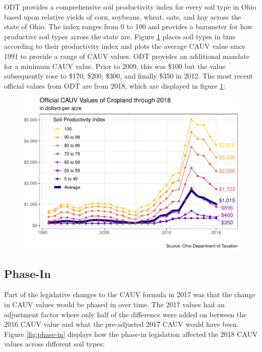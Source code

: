 \documentclass[]{article}
\begin{document}
ODT provides a comprehensive soil productivity index for every soil type
in Ohio based upon relative yields of corn, soybeans, wheat, oats, and
hay across the state of Ohio. The index ranges from 0 to 100 and
provides a barometer for how productive soil types across the state are.
Figure \ref{fig:cropland-trend} places soil types in bins according to
their productivity index and plots the average CAUV value since 1991 to
provide a range of CAUV values. ODT provides an additional mandate for a
minimum CAUV value. Prior to 2009, this was \$100 but the value
subsequently rose to \$170, \$200, \$300, and finally \$350 in 2012. The
most recent official values from ODT are from 2018, which are displayed
in figure \ref{fig:cropland-trend}:

\begin{figure}[H]
\includegraphics[width=1\linewidth]{4-projections-2019-2020_files/figure-latex/cropland-trend-1} \caption{\label{fig:cropland-trend}}\label{fig:cropland-trend}
\end{figure}

\hypertarget{phase-in}{%
\subsection{Phase-In}\label{phase-in}}

Part of the legislative changes to the CAUV formula in 2017 was that the
change in CAUV values would be phased in over time. The 2017 values had
an adjustment factor where only half of the difference were added on
between the 2016 CAUV value and what the pre-adjusted 2017 CAUV would
have been. Figure \ref{fig:phase-in} displays how the phase-in
legislation affected the 2018 CAUV values across different soil types:
\end{document}
